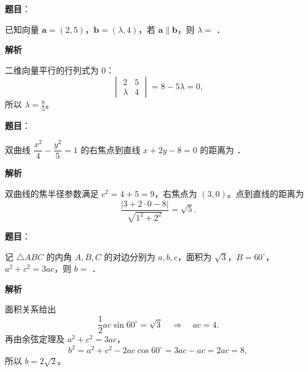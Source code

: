 \begin{answer}

\textbf{题目}：

已知向量 $\boldsymbol a=(2,5)$，$\boldsymbol b=(\lambda,4)$，若 $\boldsymbol a\parallel\boldsymbol b$，则 $\lambda=$ \gkblank{}．

\textbf{解析}

二维向量平行的行列式为 $0$：
\nopagebreak[4]
\[
\begin{vmatrix}2&5\\\lambda&4\end{vmatrix}=8-5\lambda=0,
\]
所以 $\lambda=\frac85$。


\end{answer}
\begin{answer}

\textbf{题目}：

双曲线 $\dfrac{x^2}{4}-\dfrac{y^2}{5}=1$ 的右焦点到直线 $x+2y-8=0$ 的距离为 \gkblank{}．

\textbf{解析}

双曲线的焦半径参数满足 $c^2=4+5=9$，右焦点为 $(3,0)$。点到直线的距离为
\nopagebreak[4]
\[
\frac{|3+2\cdot0-8|}{\sqrt{1^2+2^2}}=\sqrt5.
\]


\end{answer}
\begin{answer}

\textbf{题目}：

记 $\triangle ABC$ 的内角 $A,B,C$ 的对边分别为 $a,b,c$，面积为 $\sqrt3$，$B=60^\circ$，$a^2+c^2=3ac$，则 $b=$ \gkblank{}．

\textbf{解析}

面积关系给出
\nopagebreak[4]
\[
\frac12ac\sin60^\circ=\sqrt3\quad\Longrightarrow\quad ac=4.
\]
再由余弦定理及 $a^2+c^2=3ac$，
\nopagebreak[4]
\[
b^2=a^2+c^2-2ac\cos60^\circ=3ac-ac=2ac=8,
\]
所以 $b=2\sqrt2$。


\end{answer}

